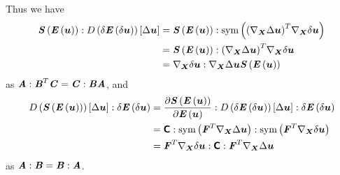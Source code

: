 Thus we have
\begin{equation}
  \begin{split}
    \doubledotprod{\fnof{\tensor{S}}{\fnof{\tensor{E}}{\vectr{u}}}}{\directionalderiv{\delta\fnof{\tensor{E}}{\delta\vectr{u}}}{\Delta\vectr{u}}}&=
    \doubledotprod{\fnof{\tensor{S}}{\fnof{\tensor{E}}{\vectr{u}}}}{\symop\pbrac{\transpose{\pbrac{\gradient{\vectr{X}}{\Delta\vectr{u}}}}\gradient{\vectr{X}}{\delta\vectr{u}}}}\\
    &=\doubledotprod{\fnof{\tensor{S}}{\fnof{\tensor{E}}{\vectr{u}}}}{\transpose{\pbrac{\gradient{\vectr{X}}{\Delta\vectr{u}}}}\gradient{\vectr{X}}{\delta\vectr{u}}}\\
    &=\doubledotprod{\gradient{\vectr{X}}{\delta\vectr{u}}}{\gradient{\vectr{X}}{\Delta\vectr{u}}\fnof{\tensor{S}}{\fnof{\tensor{E}}{\vectr{u}}}}
  \end{split}
\end{equation}
as
$\boldsymbol{\mathit{A}}:{\boldsymbol{\mathit{B}}}^{T}\boldsymbol{\mathit{C}}=\boldsymbol{\mathit{C}}:\boldsymbol{\mathit{B}}\boldsymbol{\mathit{A}}$, and
\begin{equation}
  \begin{split}
    \doubledotprod{\directionalderiv{\fnof{\tensor{S}}{\fnof{\tensor{E}}{\vectr{u}}}}{\Delta\vectr{u}}}{\delta\fnof{\tensortwo{E}}{\delta\vectr{u}}}
    &=\doubledotprod{\doubledotprod{\delby{\fnof{\tensor{S}}{\fnof{\tensor{E}}{\vectr{u}}}}{\fnof{\tensor{E}}{\vectr{u}}}}{\directionalderiv{\delta\fnof{\tensor{E}}{\delta\vectr{u}}}{\Delta\vectr{u}}}}{\delta\fnof{\tensor{E}}{\delta\vectr{u}}}\\
    &=\doubledotprod{\doubledotprod{\tensorfour{C}}{\symop\pbrac{\transpose{\tensortwo{F}}\gradient{\vectr{X}}{\Delta\vectr{u}}}}}{\symop\pbrac{\transpose{\tensortwo{F}}\gradient{\vectr{X}}{\delta\vectr{u}}}}\\
    &=\doubledotprod{\transpose{\tensortwo{F}}\gradient{\vectr{X}}{\delta\vectr{u}}}{\doubledotprod{\tensorfour{C}}{\transpose{\tensortwo{F}}\gradient{\vectr{X}}{\Delta\vectr{u}}}}
  \end{split}
\end{equation}
as
$\boldsymbol{\mathit{A}}:\boldsymbol{\mathit{B}}=\boldsymbol{\mathit{B}}:\boldsymbol{\mathit{A}}$.


